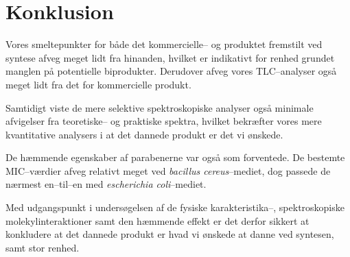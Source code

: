 \section{Konklusion}
Vores smeltepunkter for både det kommercielle-- og produktet fremstilt ved syntese afveg meget lidt fra hinanden, hvilket er indikativt for renhed grundet manglen på potentielle biprodukter. Derudover afveg vores TLC--analyser også meget lidt fra det for kommercielle produkt. 

Samtidigt viste de mere selektive spektroskopiske analyser også minimale afvigelser fra teoretiske-- og praktiske spektra, hvilket bekræfter vores mere kvantitative analysers i at det dannede produkt er det vi ønskede.

De hæmmende egenskaber af parabenerne var også som forventede. De bestemte MIC--værdier afveg relativt meget ved \textit{bacillus cereus}--mediet, dog passede de nærmest en--til--en med \textit{escherichia coli}--mediet.

Med udgangspunkt i undersøgelsen af de fysiske karakteristika--, spektroskopiske molekylinteraktioner samt den hæmmende effekt er det derfor sikkert at konkludere at det dannede produkt er hvad vi ønskede at danne ved syntesen, samt stor renhed.

